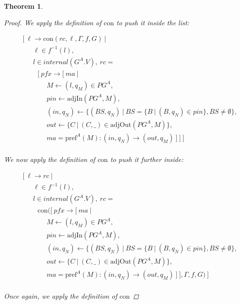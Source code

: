 \documentclass[twocolumn, openany]{sig-alternate-10pt}
\newcommand{\Con}{\mathrm{con}}
\newcommand{\Pref}{\ensuremath{\mathrm{pref}}}
\newtheorem{thm}{Theorem}
\begin{document}
\begin{thm}
\begin{proof}
  We apply the definition of $\Con$ to push it inside the list:

    \[ \begin{array}{l}
     ~~~~~ [~ \ell \rightarrow \Con(rc, \ell, \Gamma, f, G) ~\vert~ \\
     ~~~~~~~~~~~~ \ell \in f^{-1}(l), \\
     ~~~~~~~~~~~~ l \in internal(G^A.V), ~rc =  \\
     ~~~~~~~~~~~~~~~ [~ pfx \rightarrow [~ ma ~\vert~ \\
     ~~~~~~~~~~~~~~~~~~~~~ M \leftarrow (l,q_M) \in PG^A, \\
     ~~~~~~~~~~~~~~~~~~~~~ pin \leftarrow \text{adjIn}(PG^A,M), \\
     ~~~~~~~~~~~~~~~~~~~~~ (in,q_N) \leftarrow \{ (BS,q_N) ~\vert~ BS=\{B ~\vert~ (B,q_N) \in pin \}, BS \neq \emptyset \}, \\
     ~~~~~~~~~~~~~~~~~~~~~ out \leftarrow \{ C ~\vert~ (C,\_) \in \text{adjOut}(PG^A,M) \}, \\
     ~~~~~~~~~~~~~~~~~~~~~ ma = \Pref^A(M) : (in,q_N) \rightarrow (out,q_M) ~] ~] ~] \\
  \end{array} \]%

  We now apply the definition of $\Con$ to push it further inside:

      \[ \begin{array}{l}
     ~~~~~ [~ \ell \rightarrow rc ~\vert~ \\
     ~~~~~~~~~~~~ \ell \in f^{-1}(l), \\
     ~~~~~~~~~~~~ l \in internal(G^A.V), ~rc =  \\
     ~~~~~~~~~~~~~~~ \Con([~ pfx \rightarrow [~ ma ~\vert~ \\
     ~~~~~~~~~~~~~~~~~~~~~ M \leftarrow (l,q_M) \in PG^A, \\
     ~~~~~~~~~~~~~~~~~~~~~ pin \leftarrow \text{adjIn}(PG^A,M), \\
     ~~~~~~~~~~~~~~~~~~~~~ (in,q_N) \leftarrow \{ (BS,q_N) ~\vert~ BS=\{B ~\vert~ (B,q_N) \in pin \}, BS \neq \emptyset \}, \\
     ~~~~~~~~~~~~~~~~~~~~~ out \leftarrow \{ C ~\vert~ (C,\_) \in \text{adjOut}(PG^A,M) \}, \\
     ~~~~~~~~~~~~~~~~~~~~~ ma = \Pref^A(M) : (in,q_N) \rightarrow (out,q_M) ~] ~], \Gamma, f, G) ~] \\
  \end{array} \]%

  Once again, we apply the definition of $\Con$


\end{proof}
\end{thm}
\end{document}
